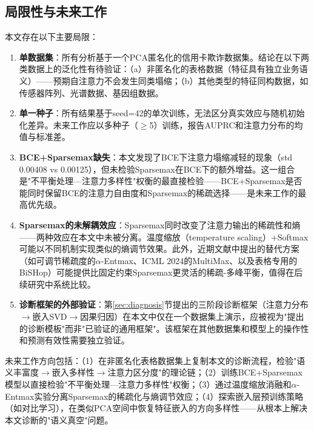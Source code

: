 \subsection{局限性与未来工作}

本文存在以下主要局限：

\begin{enumerate}
    \item \textbf{单数据集}：所有分析基于一个PCA匿名化的信用卡欺诈数据集。结论在以下两类数据上的泛化性有待验证：（a）非匿名化的表格数据（特征具有独立业务语义）——预期自注意力不会发生同类塌缩；（b）其他类型的特征同构数据，如传感器阵列、光谱数据、基因组数据。
    \item \textbf{单一种子}：所有结果基于seed=42的单次训练，无法区分真实效应与随机初始化差异。未来工作应以多种子（$\geq$5）训练，报告AUPRC和注意力分布的均值与标准差。
    \item \textbf{BCE+Sparsemax缺失}：本文发现了BCE下注意力塌缩减轻的现象（std 0.00408 vs 0.00125），但未检验Sparsemax在BCE下的额外增益。这一组合是"不平衡处理—注意力多样性"权衡的最直接检验——BCE+Sparsemax是否能同时保留BCE的注意力自由度和Sparsemax的稀疏选择——是未来工作的最高优先级。
    \item \textbf{Sparsemax的未解耦效应}：Sparsemax同时改变了注意力输出的稀疏性和熵——两种效应在本文中未被分离。温度缩放（temperature scaling）+Softmax可能以不同机制实现类似的熵调节效果。此外，近期文献中提出的替代方案（如可调节稀疏度的$\alpha$-Entmax、ICML 2024的MultiMax、以及表格专用的BiSHop）可能提供比固定约束Sparsemax更灵活的稀疏-多峰平衡，值得在后续研究中系统比较。
    \item \textbf{诊断框架的外部验证}：第\ref{sec:diagnosis}节提出的三阶段诊断框架（注意力分布$\to$嵌入SVD$\to$因果归因）在本文中仅在一个数据集上演示，应被视为"提出的诊断模板"而非"已验证的通用框架"。该框架在其他数据集和模型上的操作性和预测有效性需要独立验证。
\end{enumerate}

未来工作方向包括：（1）在非匿名化表格数据集上复制本文的诊断流程，检验"语义丰富度$\to$嵌入多样性$\to$注意力区分度"的理论链；（2）训练BCE+Sparsemax模型以直接检验"不平衡处理—注意力多样性"权衡；（3）通过温度缩放消融和$\alpha$-Entmax实验分离Sparsemax的稀疏化与熵调节效应；（4）探索嵌入层预训练策略（如对比学习），在类似PCA空间中恢复特征嵌入的方向多样性——从根本上解决本文诊断的"语义真空"问题。

